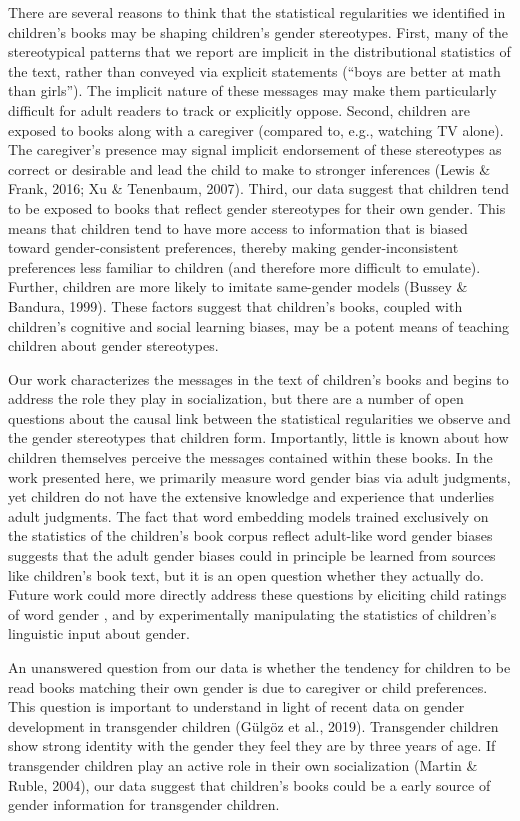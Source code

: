 \documentclass[english,,man,floatsintext]{apa6}
\begin{document}
There are several reasons to think that the statistical regularities we identified in children's books may be shaping children's gender stereotypes. First, many of the stereotypical patterns that we report are implicit in the distributional statistics of the text, rather than conveyed via explicit statements (\enquote{boys are better at math than girls}). The implicit nature of these messages may make them particularly difficult for adult readers to track or explicitly oppose. Second, children are exposed to books along with a caregiver (compared to, e.g., watching TV alone). The caregiver's presence may signal implicit endorsement of these stereotypes as correct or desirable and lead the child to make to stronger inferences (Lewis \& Frank, 2016; Xu \& Tenenbaum, 2007). Third, our data suggest that children tend to be exposed to books that reflect gender stereotypes for their own gender. This means that children tend to have more access to information that is biased toward gender-consistent preferences, thereby making gender-inconsistent preferences less familiar to children (and therefore more difficult to emulate). Further, children are more likely to imitate same-gender models (Bussey \& Bandura, 1999). These factors suggest that children's books, coupled with children's cognitive and social learning biases, may be a potent means of teaching children about gender stereotypes.

Our work characterizes the messages in the text of children's books and begins to address the role they play in socialization, but there are a number of open questions about the causal link between the statistical regularities we observe and the gender stereotypes that children form. Importantly, little is known about how children themselves perceive the messages contained within these books. In the work presented here, we primarily measure word gender bias via adult judgments, yet children do not have the extensive knowledge and experience that underlies adult judgments. The fact that word embedding models trained exclusively on the statistics of the children's book corpus reflect adult-like word gender biases suggests that the adult gender biases could in principle be learned from sources like children's book text, but it is an open question whether they actually do. Future work could more directly address these questions by eliciting child ratings of word gender , and by experimentally manipulating the statistics of children's linguistic input about gender.

An unanswered question from our data is whether the tendency for children to be read books matching their own gender is due to caregiver or child preferences. This question is important to understand in light of recent data on gender development in transgender children (Gülgöz et al., 2019). Transgender children show strong identity with the gender they feel they are by three years of age. If transgender children play an active role in their own socialization (Martin \& Ruble, 2004), our data suggest that children's books could be a early source of gender information for transgender children.
\end{document}
